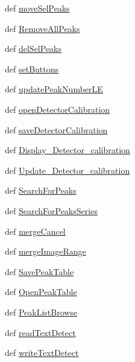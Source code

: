 \begin{DoxyCompactItemize}
\item 
def \hyperlink{class_atrex_1_1_atrex_a1b95e20242dba81dce9ed56aa33d4502}{move\-Sel\-Peaks}
\item 
def \hyperlink{class_atrex_1_1_atrex_ab8dacb09c6a0a632de6bccdc77836dec}{Remove\-All\-Peaks}
\item 
def \hyperlink{class_atrex_1_1_atrex_a3d1ea171a1570456260a8c9e1ff61f2e}{del\-Sel\-Peaks}
\item 
def \hyperlink{class_atrex_1_1_atrex_a7577e8ee32a4909dde0cdc26cec42439}{set\-Buttons}
\item 
def \hyperlink{class_atrex_1_1_atrex_a3ba5414e1ff2fd707ee5aa923371e917}{update\-Peak\-Number\-L\-E}
\item 
def \hyperlink{class_atrex_1_1_atrex_aed5e2cfdb3aa93f0b93f5f92923c10b6}{open\-Detector\-Calibration}
\item 
def \hyperlink{class_atrex_1_1_atrex_a6ddf6ff6c06c18493233eb34db019ac6}{save\-Detector\-Calibration}
\item 
def \hyperlink{class_atrex_1_1_atrex_a33ff7708e43d3f78a0da47e2740b783a}{Display\-\_\-\-Detector\-\_\-calibration}
\item 
def \hyperlink{class_atrex_1_1_atrex_abddae09c11c780c9f83fa74a693e3244}{Update\-\_\-\-Detector\-\_\-calibration}
\item 
def \hyperlink{class_atrex_1_1_atrex_a99527243c5cb42e343391bbd921321f0}{Search\-For\-Peaks}
\item 
def \hyperlink{class_atrex_1_1_atrex_aa44defd7fc02dad7f4371e2a2eccf710}{Search\-For\-Peaks\-Series}
\item 
def \hyperlink{class_atrex_1_1_atrex_a816143e04438e686d80a2172cb484f44}{merge\-Cancel}
\item 
def \hyperlink{class_atrex_1_1_atrex_acc559ce6fbdf2cb95ada0b191ced0c04}{merge\-Image\-Range}
\item 
def \hyperlink{class_atrex_1_1_atrex_aff22266d12cc6092353a9e53081edb9d}{Save\-Peak\-Table}
\item 
def \hyperlink{class_atrex_1_1_atrex_af2a8d53b7aa4d5211b9eb3ac25045501}{Open\-Peak\-Table}
\item 
def \hyperlink{class_atrex_1_1_atrex_aa996a3132c9ace217efe5826349df1df}{Peak\-List\-Browse}
\item 
def \hyperlink{class_atrex_1_1_atrex_a5e8c4a39fedb7dff274082c2b7cc352f}{read\-Text\-Detect}
\item 
def \hyperlink{class_atrex_1_1_atrex_a0545caa06d0d5297147a325e9f2763c5}{write\-Text\-Detect}
\item 

\end{DoxyCompactItemize}
